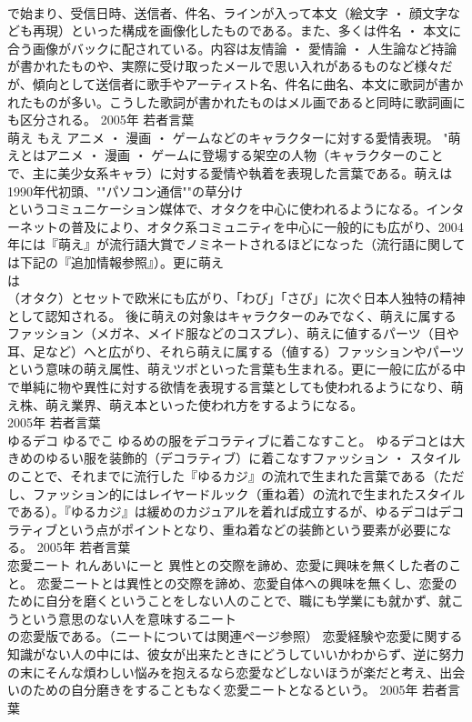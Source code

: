 \documentclass[8pt]{extreport}
\begin{document}
\begin{CJK}{UTF8}{min}
\\	で始まり、受信日時、送信者、件名、ラインが入って本文（絵文字 ・ 顔文字なども再現）といった構成を画像化したものである。また、多くは件名 ・ 本文に合う画像がバックに配されている。内容は友情論 ・ 愛情論 ・ 人生論など持論が書かれたものや、実際に受け取ったメールで思い入れがあるものなど様々だが、傾向として送信者に歌手やアーティスト名、件名に曲名、本文に歌詞が書かれたものが多い。こうした歌詞が書かれたものはメル画であると同時に歌詞画にも区分される。	2005年	若者言葉	
\\	萌え	もえ	アニメ ・ 漫画 ・ ゲームなどのキャラクターに対する愛情表現。	"萌えとはアニメ ・ 漫画 ・ ゲームに登場する架空の人物（キャラクターのことで、主に美少女系キャラ）に対する愛情や執着を表現した言葉である。萌えは1990年代初頭、""パソコン通信""の草分け
\\	というコミュニケーション媒体で、オタクを中心に使われるようになる。インターネットの普及により、オタク系コミュニティを中心に一般的にも広がり、2004年には『萌え』が流行語大賞でノミネートされるほどになった（流行語に関しては下記の『追加情報参照』）。更に萌え
\\	は
\\	（オタク）とセットで欧米にも広がり、「わび」「さび」に次ぐ日本人独特の精神として認知される。 後に萌えの対象はキャラクターのみでなく、萌えに属するファッション（メガネ、メイド服などのコスプレ）、萌えに値するパーツ（目や耳、足など）へと広がり、それら萌えに属する（値する）ファッションやパーツという意味の萌え属性、萌えツボといった言葉も生まれる。更に一般に広がる中で単純に物や異性に対する欲情を表現する言葉としても使われるようになり、萌え株、萌え業界、萌え本といった使われ方をするようになる。
\\	2005年	若者言葉	
\\	ゆるデコ	ゆるでこ	ゆるめの服をデコラティブに着こなすこと。	ゆるデコとは大きめのゆるい服を装飾的（デコラティブ）に着こなすファッション ・ スタイルのことで、それまでに流行した『ゆるカジ』の流れで生まれた言葉である（ただし、ファッション的にはレイヤードルック（重ね着）の流れで生まれたスタイルである）。『ゆるカジ』は緩めのカジュアルを着れば成立するが、ゆるデコはデコラティブという点がポイントとなり、重ね着などの装飾という要素が必要になる。	2005年	若者言葉	
\\	恋愛ニート	れんあいにーと	異性との交際を諦め、恋愛に興味を無くした者のこと。	恋愛ニートとは異性との交際を諦め、恋愛自体への興味を無くし、恋愛のために自分を磨くということをしない人のことで、職にも学業にも就かず、就こうという意思のない人を意味するニート
\\	の恋愛版である。（ニートについては関連ページ参照） 恋愛経験や恋愛に関する知識がない人の中には、彼女が出来たときにどうしていいかわからず、逆に努力の末にそんな煩わしい悩みを抱えるなら恋愛などしないほうが楽だと考え、出会いのための自分磨きをすることもなく恋愛ニートとなるという。	2005年	若者言葉	

\end{CJK}
\end{document}
